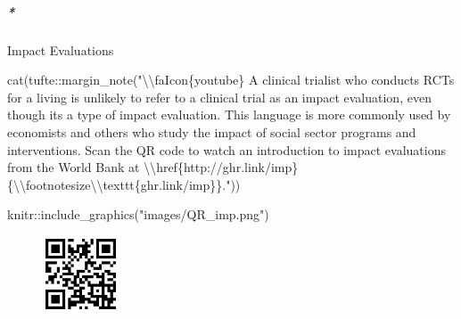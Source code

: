 \documentclass[
  letterpaper,
  DIV=11,
  numbers=noendperiod,
  oneside]{scrartcl}
\let\oldsubparagraph\subparagraph
\renewcommand{\subparagraph}[1]{\oldsubparagraph{#1}\mbox{}}
\newenvironment{Shaded}{\begin{snugshade}}{\end{snugshade}}
\newcommand{\FunctionTok}[1]{\textcolor[rgb]{0.28,0.35,0.67}{#1}}
\newcommand{\NormalTok}[1]{\textcolor[rgb]{0.00,0.23,0.31}{#1}}
\newcommand{\SpecialCharTok}[1]{\textcolor[rgb]{0.37,0.37,0.37}{#1}}
\newcommand{\StringTok}[1]{\textcolor[rgb]{0.13,0.47,0.30}{#1}}
\begin{document}
\hypertarget{impact-evaluations}{%
\subparagraph*{Impact Evaluations}\label{impact-evaluations}}

\begin{Shaded}
\begin{Highlighting}[]
\FunctionTok{cat}\NormalTok{(tufte}\SpecialCharTok{::}\FunctionTok{margin\_note}\NormalTok{(}\StringTok{"}\SpecialCharTok{\textbackslash{}\textbackslash{}}\StringTok{faIcon\{youtube\} A clinical trialist who conducts RCTs for a living is unlikely to refer to a clinical trial as an \textquotesingle{}impact evaluation\textquotesingle{}, even though it\textquotesingle{}s a type of impact evaluation. This language is more commonly used by economists and others who study the impact of social sector programs and interventions. Scan the QR code to watch an introduction to impact evaluations from the World Bank at }\SpecialCharTok{\textbackslash{}\textbackslash{}}\StringTok{href\{http://ghr.link/imp\}\{}\SpecialCharTok{\textbackslash{}\textbackslash{}}\StringTok{footnotesize}\SpecialCharTok{\textbackslash{}\textbackslash{}}\StringTok{texttt\{ghr.link/imp\}\}."}\NormalTok{))}
\end{Highlighting}
\end{Shaded}


\begin{Shaded}
\begin{Highlighting}[]
\NormalTok{knitr}\SpecialCharTok{::}\FunctionTok{include\_graphics}\NormalTok{(}\StringTok{"images/QR\_imp.png"}\NormalTok{)}
\end{Highlighting}
\end{Shaded}

\begin{figure}[H]

{\centering \includegraphics[width=0.2\textwidth,height=\textheight]{images/QR_imp.png}

}

\end{figure}
\end{document}
